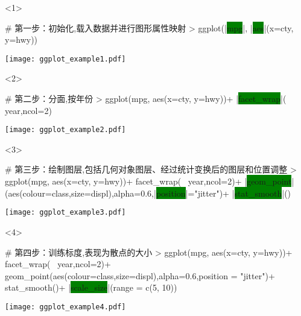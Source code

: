 \begin{frame}[c,fragile]{\subsecname}{\subsubsecname}
\begin{onlyenv}<1>
\begin{minipage}{\textwidth}
\begin{rcode}
# 第一步：初始化,载入数据并进行图形属性映射
> ggplot(|\colorbox{green}{mpg}|, |\colorbox{green}{aes}|(x=cty, y=hwy))
\end{rcode}
\end{minipage}
\begin{minipage}{\textwidth}
\centering
\texttt{[image: ggplot\_example1.pdf]}
\end{minipage}
\end{onlyenv}

\begin{onlyenv}<2>
\begin{minipage}{\textwidth}
\begin{rcode}
# 第二步：分面,按年份
> ggplot(mpg, aes(x=cty, y=hwy))+
      |\colorbox{green}{facet\_wrap}|(~ year,ncol=2)
\end{rcode}
\end{minipage}
\begin{minipage}{\textwidth}
\centering
\texttt{[image: ggplot\_example2.pdf]}
\end{minipage}
\end{onlyenv}

\begin{onlyenv}<3>
\begin{minipage}{\textwidth}
\begin{rcode}
# 第三步：绘制图层,包括几何对象图层、经过统计变换后的图层和位置调整
> ggplot(mpg, aes(x=cty, y=hwy))+
      facet_wrap(~ year,ncol=2)+
      |\colorbox{green}{geom\_point}|(aes(colour=class,size=displ),alpha=0.6,|\colorbox{green}{position}|="jitter")+  
      |\colorbox{green}{stat\_smooth}|()
\end{rcode}
\end{minipage}
\begin{minipage}{\textwidth}
\centering
\texttt{[image: ggplot\_example3.pdf]}
\end{minipage}
\end{onlyenv}

\begin{onlyenv}<4>
\begin{minipage}{\textwidth}
\begin{rcode}
# 第四步：训练标度,表现为散点的大小
> ggplot(mpg, aes(x=cty, y=hwy))+
      facet_wrap(~ year,ncol=2)+
      geom_point(aes(colour=class,size=displ),alpha=0.6,position = "jitter")+  
      stat_smooth()+  
      |\colorbox{green}{scale\_size}|(range = c(5, 10))
\end{rcode}
\end{minipage}
\begin{minipage}{\textwidth}
\centering
\texttt{[image: ggplot\_example4.pdf]}
\end{minipage}
\end{onlyenv}


\end{frame}
